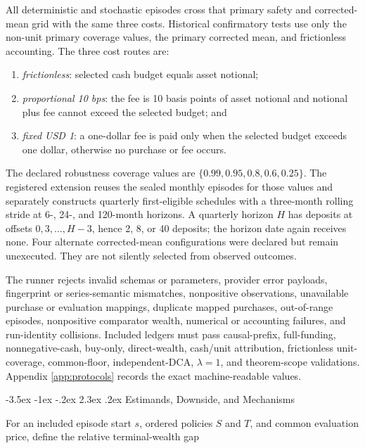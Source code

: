 \documentclass[12pt,a4paper,oneside]{report}
\makeatletter
\renewcommand\section{\@startsection{section}{1}{\z@}%
  {-3.5ex \@plus -1ex \@minus -.2ex}%
  {2.3ex \@plus .2ex}%
  {\normalfont\fontsize{14}{17}\selectfont\bfseries}}
\makeatother
\begin{document}
All deterministic and stochastic episodes cross that primary safety and
corrected-mean grid with the same three costs. Historical confirmatory tests
use only the non-unit primary coverage values, the primary corrected mean, and
frictionless accounting. The three cost routes are:

\begin{enumerate}
  \item \emph{frictionless}: selected cash budget equals asset notional;
  \item \emph{proportional 10 bps}: the fee is 10 basis points of asset
  notional and notional plus fee cannot exceed the selected budget; and
  \item \emph{fixed USD 1}: a one-dollar fee is paid only when the selected
  budget exceeds one dollar, otherwise no purchase or fee occurs.
\end{enumerate}

The declared robustness coverage values are
$\{0.99,0.95,0.8,0.6,0.25\}$. The registered extension reuses the sealed
monthly episodes for those values and separately constructs quarterly
first-eligible schedules with a three-month rolling stride at 6-, 24-, and
120-month horizons. A quarterly horizon $H$ has deposits at offsets
$0,3,\ldots,H-3$, hence 2, 8, or 40 deposits; the horizon date again receives
none. Four alternate corrected-mean configurations were declared but remain
unexecuted. They are not silently selected from observed outcomes.

The runner rejects invalid schemas or parameters, provider error payloads,
fingerprint or series-semantic mismatches, nonpositive observations,
unavailable purchase or evaluation mappings, duplicate mapped purchases,
out-of-range episodes, nonpositive comparator wealth, numerical or accounting
failures, and run-identity collisions. Included ledgers must pass causal-prefix,
full-funding, nonnegative-cash, buy-only, direct-wealth, cash/unit attribution,
frictionless unit-coverage, common-floor, independent-DCA, $\lambda=1$, and
theorem-scope validations. Appendix \ref{app:protocols} records the exact
machine-readable values.

\section{Estimands, Downside, and Mechanisms}
\label{sec:estimands}

For an included episode start $s$, ordered policies $S$ and $T$, and common
evaluation price, define the relative terminal-wealth gap
\end{document}
